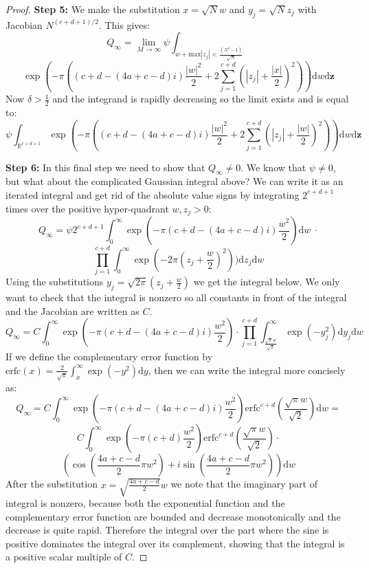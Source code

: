 \documentclass[letterpaper]{article}
\begin{document}
\begin{proof}
\noindent\textbf{Step 5:} We make the substitution $x=\sqrt{N}w$
and $y_j = \sqrt{N}z_j$ with Jacobian $N^{(c+d+1)/2}$. This gives:
$$Q_\infty = \lim_{M \to \infty}\psi
\int_{w+\mathrm{max}|z_j|<\frac{(N^\delta-1)}{\sqrt{N}}}$$
$$\exp(-\pi\left(( c+d
-(4a+c-d)i)\frac{|w|^2}{2}+2\sum_{j=1}^{c+d}(|z_j|+\frac{|x|}{2})^2\right))\mathrm{d}w\mathrm{d}\mathbf{z}$$
Now $\delta>\frac{1}{2}$ and the integrand is rapidly decreasing
so the limit exists and is equal to:
$$\psi \int_{\mathbb{R}^{c+d+1}}\exp(-\pi\left(( c+d -(4a+c-d)i)\frac{|w|^2}{2}+2\sum_{j=1}^{c+d}(|z_j|+\frac{|w|}{2})^2\right))\mathrm{d}w\mathrm{d}\mathbf{z}$$

\noindent\textbf{Step 6:} In this final step we need to show that
$Q_\infty \neq 0$. We know that $\psi \neq 0$, but what about the
complicated Gaussian integral above? We can write it as an
iterated integral and get rid of the absolute value signs by
integrating $2^{c+d+1}$ times over the positive hyper-quadrant
$w,z_j>0$: $$Q_\infty= \psi 2^{c+d+1}\int_{0}^\infty\exp(-\pi( c+d
-(4a+c-d)i)\frac{w^2}{2})\mathrm{d}w\ \cdot$$
$$\prod_{j=1}^{c+d}\int_{0}^\infty\exp(-2\pi(z_j+\frac{w}{2})^2))\mathrm{d}z_j\mathrm{d}w$$
Using the substitutions $y_j = \sqrt{2\pi}(z_j+\frac{w}{2})$ we
get the integral below. We only want to check that the integral is
nonzero so all constants in front of the integral and the Jacobian
are written as $C$. $$Q_\infty= C\int_{0}^\infty\exp(-\pi( c+d
-(4a+c-d)i)\frac{w^2}{2})\cdot\prod_{j=1}^{c+d}\int_{\frac{\sqrt{\pi}w}{\sqrt{2}}}^\infty\exp(-y_j^2)\mathrm{d}y_j\mathrm{d}w$$
If we define the complementary error function by $\mathrm{erfc}(x)
= \frac{2}{\sqrt{\pi}}\int_{x}^\infty \exp(-y^2)\mathrm{d}y$, then
we can write the integral more concisely as:
$$Q_\infty= C\int_{0}^\infty\exp(-\pi( c+d -(4a+c-d)i)\frac{w^2}{2})\mathrm{erfc}^{c+d}\left(\frac{\sqrt{\pi}w}{\sqrt{2}}\right)\mathrm{d}w =$$
$$C\int_{0}^\infty\exp(-\pi(c+d)\frac{w^2}{2})\mathrm{erfc}^{c+d}\left(\frac{\sqrt{\pi}w}{\sqrt{2}}\right)\cdot$$ $$\left(\cos(\frac{4a+c-d}{2}\pi w^2) + i\sin(\frac{4a+c-d}{2}\pi w^2)\right)\mathrm{d}w $$
After the substitution $x = \sqrt{\frac{4a+c-d}{2}}w$ we note that
the imaginary part of integral is nonzero, because both the
exponential function and the complementary error function are
bounded and decrease monotonically and the decrease is quite
rapid. Therefore the integral over the part where the sine is
positive dominates the integral over its complement, showing that
the integral is a positive scalar multiple of $C$.
\end{proof}
\end{document}
